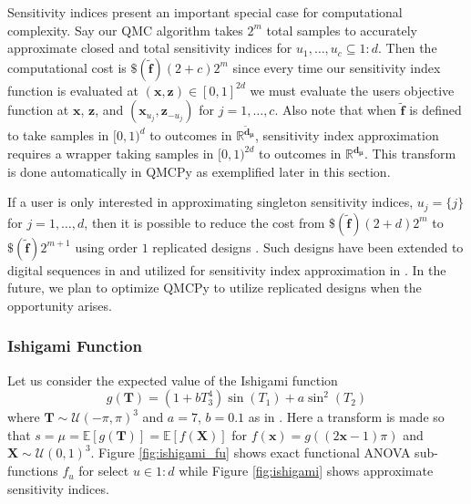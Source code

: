 \documentclass[graybox]{svmult}
\begin{document}
Sensitivity indices present an important special case for computational complexity. Say our QMC algorithm takes $2^m$ total samples to accurately approximate closed and total sensitivity indices for $u_1,\dots,u_c \subseteq 1:d$. Then the computational cost is $\$(\tilde{\boldsymbol{f}})(2+c)2^m$ since every time our sensitivity index function is evaluated at $(\boldsymbol{x},\boldsymbol{z}) \in [0,1]^{2d}$ we must evaluate the users objective function at $\boldsymbol{x}$, $\boldsymbol{z}$, and $(\boldsymbol{x}_{u_j},\boldsymbol{z}_{-{u_j}})$ for $j=1,\dots,c$. Also note that when $\tilde{\boldsymbol{f}}$ is defined to take samples in  $[0,1)^{d}$ to outcomes in $\mathbb{R}^{\tilde{\boldsymbol{d}}_{\boldsymbol{\mu}}}$, sensitivity index approximation requires a wrapper taking samples in $[0,1)^{2d}$ to outcomes in $\mathbb{R}^{\boldsymbol{d}_{\boldsymbol{\mu}}}$. This transform is done automatically in QMCPy as exemplified later in this section. 

If a user is only interested in approximating singleton sensitivity indices, $u_j = \{j\}$ for $j=1,\dots,d$, then it is possible to reduce the cost from $\$(\tilde{\boldsymbol{f}})(2+d)2^m$ to $\$(\tilde{\boldsymbol{f}})2^{m+1}$ using order $1$ replicated designs \cite{alex2008comparison,tissot2015randomized}. Such designs have been extended to  digital sequences in \cite{replicated_designs_sobol_seq} and utilized for sensitivity index approximation in \cite{reliable_sobol_indices_approx}. In the future, we plan to optimize QMCPy to utilize replicated designs when the opportunity arises.

\subsubsection{Ishigami Function}

Let us consider the expected value of the Ishigami function \cite{ishigami1990importance}
\begin{equation}
    g(\boldsymbol{T}) = (1+bT_3^4)\sin(T_1)+a\sin^2(T_2)
    \label{eq:ishigami}
\end{equation}
where $\boldsymbol{T} \sim \mathcal{U}(-\pi,\pi)^3$ and $a=7$, $b=0.1$ as in \cite{crestaux2007polynomial,marrel2009calculations}. Here a transform is made so that $s = \mu = \mathbb{E}[g(\boldsymbol{T})]=\mathbb{E}[f(\boldsymbol{X})]$ for $f(\boldsymbol{x}) = g((2\boldsymbol{x}-1)\pi)$ and $\boldsymbol{X} \sim \mathcal{U}(0,1)^3$.  Figure \ref{fig:ishigami_fu} shows exact functional ANOVA sub-functions $f_u$ for select $u \in 1:d$ while Figure \ref{fig:ishigami} shows approximate sensitivity indices.
\end{document}
